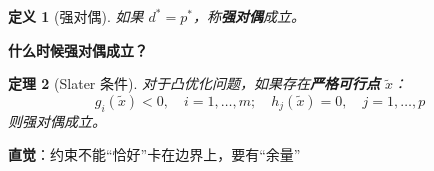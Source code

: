\documentclass[12pt, a4paper]{ctexart}
\newtheorem{theorem}{定理}[section]
\newtheorem{definition}[theorem]{定义}
\begin{document}
\begin{blackboard}[强对偶]

\begin{definition}[强对偶]
如果 $d^* = p^*$，称\textbf{强对偶}成立。
\end{definition}

\textbf{什么时候强对偶成立？}

\begin{theorem}[Slater 条件]
对于凸优化问题，如果存在\textbf{严格可行点} $\tilde{x}$：
\[
g_i(\tilde{x}) < 0, \quad i = 1, \ldots, m; \quad h_j(\tilde{x}) = 0, \quad j = 1, \ldots, p
\]
则强对偶成立。
\end{theorem}

\textbf{直觉}：约束不能``恰好''卡在边界上，要有``余量''

\end{blackboard}
\end{document}
